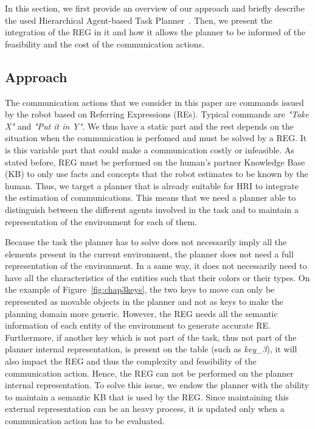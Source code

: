 \documentclass[a4paper,11pt,twoside]{StyleThese}
\begin{document}
In this section, we first provide an overview of our approach and briefly describe the used Hierarchical Agent-based Task Planner~\cite{lallement2014hatp}. Then, we present the integration of the REG in it and how it allows the planner to be informed of the feasibility and the cost of the communication actions.

\subsection{Approach}


The communication actions that we consider in this paper are commands issued by the robot based on Referring Expressions (REs). Typical commands are \textit{"Take X"} and \textit{"Put it in Y"}. We thus have a static part and the rest depends on the situation when the communication is perfomed and must be solved by a REG. It is this variable part that could make a communication costly or infeasible. As stated before, REG must be performed on the human's partner Knowledge Base (KB) to only use facts and concepts that the robot estimates to be known by the human. Thus, we target a planner that is already suitable for HRI to integrate the estimation of communications. This means that we need a planner able to distinguish between the different agents involved in the task and to maintain a representation of the environment for each of them.

Because the task the planner has to solve does not necessarily imply all the elements present in the current environment, the planner does not need a full representation of the environment. In a same way, it does not necessarily need to have all the characteristics of the entities such that their colors or their types. On the example of Figure~\ref{fig:chap3keys}, the two keys to move can only be represented as movable objects in the planner and not as keys to make the planning domain more generic. However, the REG needs all the semantic information of each entity of the environment to generate accurate RE. Furthermore, if another key which is not part of the task, thus not part of the planner internal representation, is present on the table (such as \textit{key\_3}), it will also impact the REG and thus the complexity and feasibility of the communication action. 
Hence, the REG can not be performed on the planner internal representation.
To solve this issue, we endow the planner with the ability to maintain a semantic KB that is used by the REG. Since maintaining this external representation can be an heavy process, it is updated only when a communication action has to be evaluated.
\end{document}
